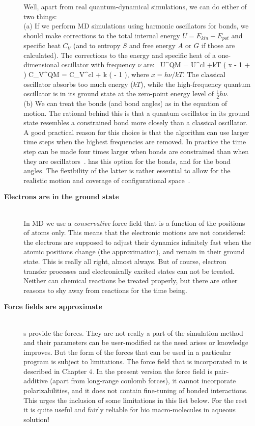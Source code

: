 \begin{description}
Well, apart from real quantum-dynamical simulations, we can do either
of two things: \\ (a) If we perform MD simulations using harmonic
oscillators for bonds, we should make corrections to the total
internal energy $U = E_{kin} + E_{pot}$ and specific heat $C_V$ (and
to entropy $S$ and free energy $A$ or $G$ if those are
calculated). The corrections to the energy and specific heat of a
one-dimensional oscillator with frequency $\nu$
are:~\cite{McQuarrie76}
\beq
 U^{QM} = U^{cl} +kT \left( \half x - 1 +  \right)
\eeq
\beq
 C_V^{QM} = C_V^{cl} + k \left(  - 1 \right), 
\eeq
where $x=h\nu /kT$. The classical oscillator absorbs too much energy
($kT$), while the high-frequency quantum oscillator is in its ground
state at the zero-point energy level of $\frac{1}{2} h\nu$. \\ 
(b) We can treat the bonds (and bond angles) as {\em {}} in
the equation of motion. The rational behind this is that a quantum
oscillator in its ground state resembles a constrained bond more
closely than a classical oscillator. A good practical reason for this
choice is that the algorithm can use larger time steps when the
highest frequencies are removed. In practice the time step can be made
four times larger when bonds are constrained than when they are
oscillators~\cite{Gunsteren77}. {\gromacs} has this option for the
bonds, and for the bond angles.  The flexibility of the latter is
rather essential to allow for the realistic motion and coverage of
configurational space~\cite{Gunsteren77}.    

\item[{\bf Electrons are in the ground state}]\mbox{}\\
In MD we use a {\em conservative} force field that is a
function of the positions of atoms only.  This means that the
electronic motions are not considered: the electrons are supposed to
adjust their dynamics infinitely fast when the atomic positions change
(the {\em {}} approximation), and remain in
their ground state. This is really all right, almost always. But of
course, electron transfer processes and electronically excited states
can not be treated. Neither can chemical reactions be treated
properly, but there are other reasons to shy away from reactions for
the time being.

\item[{\bf Force fields are approximate}]\mbox{}\\
s provide the forces. They are not really a part of the
simulation method and their parameters can be user-modified as the
need arises or knowledge improves. But the form of the forces that can
be used in a particular program is subject to limitations. The force
field that is incorporated in {\gromacs} is described in Chapter 4. In
the present version the force field is pair-additive (apart from
long-range coulomb forces), it cannot incorporate
polarizabilities, and it does not contain fine-tuning of bonded
interactions. This urges the inclusion of some limitations in this
list below.  For the rest it is quite useful and fairly reliable for
bio macro-molecules in aqueous solution!


\end{description}
